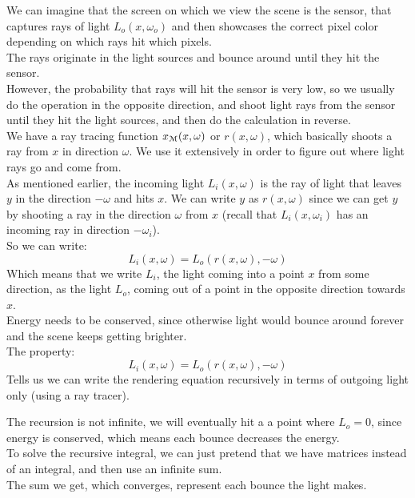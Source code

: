 \documentclass[12pt]{article}
\begin{document}
We can imagine that the screen on which we view the
scene is the sensor, that captures rays of light 
$L_o(x, \omega_o)$ and then showcases the correct pixel
color depending on which rays hit which pixels. \\
The rays originate in the light sources and bounce around
until they hit the sensor. \\
However, the probability that rays will hit the sensor
is very low, so we usually do the operation in the
opposite direction, and shoot light rays from the sensor
until they hit the light sources,
and then do the calculation in reverse. \\

We have a ray tracing function $x_{\mathcal{M}}(x, \omega)$
or $r(x, \omega)$, which basically shoots a ray
from $x$ in direction $\omega$. We use it extensively
in order to figure out where light rays go and come from. \\

As mentioned earlier, the incoming light $L_i(x, \omega)$
is the ray of light that leaves $y$ in the direction $-\omega$
and hits $x$.
We can write $y$ as $r(x,\omega)$
since we can get $y$ by shooting a ray in the direction
$\omega$ from $x$ (recall that $L_i(x, \omega_i)$
has an incoming ray in direction $-\omega_i$). \\
So we can write:
\[ L_i(x, \omega) = L_o(r(x, \omega), -\omega) \]
Which means that we write $L_i$,
the light coming into a point $x$ from some direction,
as the light $L_o$, coming out of a point in
the opposite direction towards $x$. \\

Energy needs to be conserved, since otherwise light would
bounce around forever and the scene keeps getting brighter. \\

The property:
\[ L_i(x, \omega) = L_o(r(x, \omega), -\omega) \]
Tells us we can write the rendering equation recursively
in terms of outgoing light only (using a ray tracer). 

The recursion is not infinite, we will eventually hit a
a point where $L_o = 0$, since energy is conserved,
which means each bounce decreases the energy. \\

To solve the recursive integral, we can just pretend
that we have matrices instead of an integral, 
and then use an infinite sum. \\
The sum we get, which converges, represent each bounce
the light makes. \\
\end{document}
